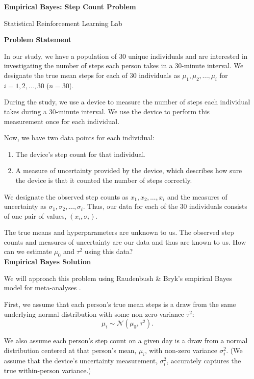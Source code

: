 \documentclass[letterpaper, 11pt]{extarticle}\usepackage[]{graphicx}\usepackage[]{xcolor}
\begin{document}
\begin{Large}
    \textsf{\textbf{Empirical Bayes: Step Count Problem}}   \par
    Statistical Reinforcement Learning Lab
\end{Large}

\vspace{2ex}

\textsf{\textbf{Problem Statement}}

In our study, we have a population of 30 unique individuals and are interested in investigating the number of steps each person takes in a 30-minute interval. We designate the true mean steps for each of 30 individuals as $\mu_1, \mu_2, \dots, \mu_i$ for $i=1, 2,\dots, 30$  ($n=30$). 

During the study, we use a device to measure the number of steps each individual takes during a 30-minute interval. We use the device to perform this measurement once for each individual. 

Now, we have two data points for each individual:\begin{enumerate}
\itemsep0em 
    \item The device's step count for that individual.
    \item A measure of uncertainty provided by the device, which describes how sure the device is that it counted the number of steps correctly.
\end{enumerate}
We designate the observed step counts as $x_1, x_2, \dots, x_i$ and the measures of uncertainty as $\sigma_1, \sigma_2, \dots, \sigma_i$. Thus, our data for each of the 30 individuals consists of one pair of values, $(x_i, \sigma_i)$. 

The true means and hyperparameters are unknown to us. The observed step counts and measures of uncertainty are our data and thus are known to us. How can we estimate $\mu_0$ and $\tau^2$ using this data?
\\

\textsf{\textbf{Empirical Bayes Solution}}

We will approach this problem using Raudenbush \& Bryk's empirical Bayes model for meta-analyses \cite{doi:10.3102/10769986010002075}. 

First, we assume that each person's true mean steps is a draw from the same underlying normal distribution with some non-zero variance $\tau^2$: $$\mu_i \sim \mathcal{N}(\mu_0, \tau^2).$$ 

We also assume each person's step count on a given day is a draw from a normal distribution centered at that person's mean, $\mu_i$, with non-zero variance $\sigma_i^2$. (We assume that the device's uncertainty measurement, $\sigma_i^2$, accurately captures the true within-person variance.)
\end{document}
